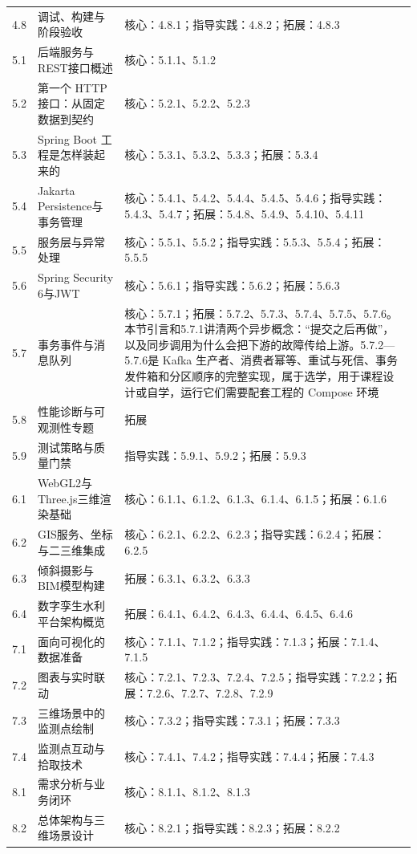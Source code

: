 \begin{longtable}{p{1.2cm}p{4.6cm}p{8.0cm}}
4.8 & 调试、构建与阶段验收 & 核心：4.8.1；指导实践：4.8.2；拓展：4.8.3 \\
5.1 & 后端服务与REST接口概述 & 核心：5.1.1、5.1.2 \\
5.2 & 第一个 HTTP 接口：从固定数据到契约 & 核心：5.2.1、5.2.2、5.2.3 \\
5.3 & Spring Boot 工程是怎样装起来的 & 核心：5.3.1、5.3.2、5.3.3；拓展：5.3.4 \\
5.4 & Jakarta Persistence与事务管理 & 核心：5.4.1、5.4.2、5.4.4、5.4.5、5.4.6；指导实践：5.4.3、5.4.7；拓展：5.4.8、5.4.9、5.4.10、5.4.11 \\
5.5 & 服务层与异常处理 & 核心：5.5.1、5.5.2；指导实践：5.5.3、5.5.4；拓展：5.5.5 \\
5.6 & Spring Security 6与JWT & 核心：5.6.1；指导实践：5.6.2；拓展：5.6.3 \\
5.7 & 事务事件与消息队列 & 核心：5.7.1；拓展：5.7.2、5.7.3、5.7.4、5.7.5、5.7.6。本节引言和5.7.1讲清两个异步概念：“提交之后再做”，以及同步调用为什么会把下游的故障传给上游。5.7.2—5.7.6是 Kafka 生产者、消费者幂等、重试与死信、事务发件箱和分区顺序的完整实现，属于选学，用于课程设计或自学，运行它们需要配套工程的 Compose 环境 \\
5.8 & 性能诊断与可观测性专题 & 拓展 \\
5.9 & 测试策略与质量门禁 & 指导实践：5.9.1、5.9.2；拓展：5.9.3 \\
6.1 & WebGL2与Three.js三维渲染基础 & 核心：6.1.1、6.1.2、6.1.3、6.1.4、6.1.5；拓展：6.1.6 \\
6.2 & GIS服务、坐标与二三维集成 & 核心：6.2.1、6.2.2、6.2.3；指导实践：6.2.4；拓展：6.2.5 \\
6.3 & 倾斜摄影与BIM模型构建 & 拓展：6.3.1、6.3.2、6.3.3 \\
6.4 & 数字孪生水利平台架构概览 & 拓展：6.4.1、6.4.2、6.4.3、6.4.4、6.4.5、6.4.6 \\
7.1 & 面向可视化的数据准备 & 核心：7.1.1、7.1.2；指导实践：7.1.3；拓展：7.1.4、7.1.5 \\
7.2 & 图表与实时联动 & 核心：7.2.1、7.2.3、7.2.4、7.2.5；指导实践：7.2.2；拓展：7.2.6、7.2.7、7.2.8、7.2.9 \\
7.3 & 三维场景中的监测点绘制 & 核心：7.3.2；指导实践：7.3.1；拓展：7.3.3 \\
7.4 & 监测点互动与拾取技术 & 核心：7.4.1、7.4.2；指导实践：7.4.4；拓展：7.4.3 \\
8.1 & 需求分析与业务闭环 & 核心：8.1.1、8.1.2、8.1.3 \\
8.2 & 总体架构与三维场景设计 & 核心：8.2.1；指导实践：8.2.3；拓展：8.2.2 \\

\end{longtable}
